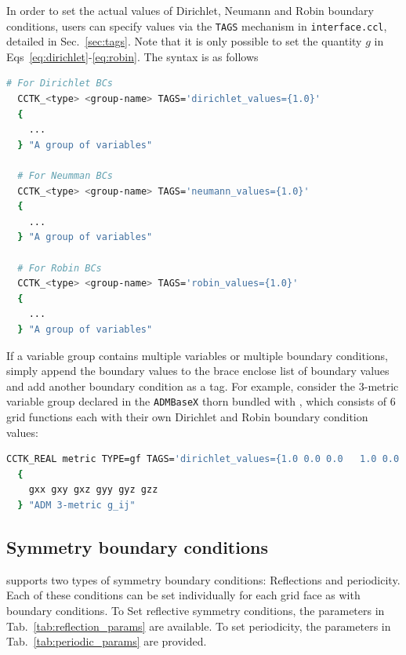 In order to set the actual values of Dirichlet, Neumann and Robin boundary conditions, users can specify values via the \texttt{TAGS} mechanism in \texttt{interface.ccl}, detailed in Sec.~\ref{sec:tags}. Note that it is only possible to set the quantity $g$ in Eqs~\eqref{eq:dirichlet}-\eqref{eq:robin}. The syntax is as follows

\begin{lstlisting}[language=bash]
  # For Dirichlet BCs
  CCTK_<type> <group-name> TAGS='dirichlet_values={1.0}'
  {
    ...
  } "A group of variables"

  # For Neumman BCs
  CCTK_<type> <group-name> TAGS='neumann_values={1.0}'
  {
    ...
  } "A group of variables"

  # For Robin BCs
  CCTK_<type> <group-name> TAGS='robin_values={1.0}'
  {
    ...
  } "A group of variables"
\end{lstlisting}

If a variable group contains multiple variables or multiple boundary conditions, simply append the boundary values to the brace enclose list of boundary values and add another boundary condition as a tag. For example, consider the 3-metric variable group declared in the \texttt{ADMBaseX} thorn bundled with \CarpetX, which consists of 6 grid functions each with their own Dirichlet and Robin boundary condition values:

\begin{lstlisting}[language=bash]
  CCTK_REAL metric TYPE=gf TAGS='dirichlet_values={1.0 0.0 0.0   1.0 0.0   1.0} robin_values={1.0 0.0 0.0   1.0 0.0   1.0} ...'
  {
    gxx gxy gxz gyy gyz gzz
  } "ADM 3-metric g_ij"
\end{lstlisting}

\subsection{Symmetry boundary conditions}

\CarpetX\space supports two types of symmetry boundary conditions: Reflections and periodicity. Each of these conditions can be set individually for each grid face as with boundary conditions. To Set reflective symmetry conditions, the parameters in Tab.~\ref{tab:reflection_params} are available. To set periodicity, the parameters in Tab.~\ref{tab:periodic_params} are provided.

